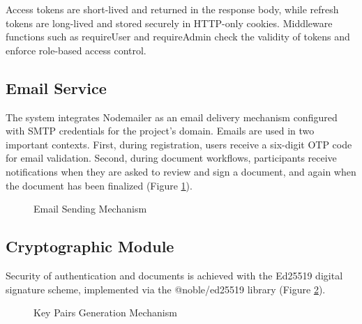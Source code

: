 Access tokens are short-lived and returned in the response body, while refresh tokens are long-lived and stored securely in HTTP-only cookies. Middleware functions such as requireUser and requireAdmin check the validity of tokens and enforce role-based access control.

\subsection{Email Service}
The system integrates Nodemailer as an email delivery mechanism configured with SMTP credentials for the project’s domain. Emails are used in two important contexts. First, during registration, users receive a six-digit OTP code for email validation. Second, during document workflows, participants receive notifications when they are asked to review and sign a document, and again when the document has been finalized (Figure \ref{email-sending}).

\begin{figure}[H]
    \centering
    \caption{Email Sending Mechanism}
    \label{email-sending}
\end{figure}

\subsection{Cryptographic Module}
Security of authentication and documents is achieved with the Ed25519 digital signature scheme, implemented via the @noble/ed25519 library (Figure \ref{keygen}). 

\begin{figure}[H]
    \centering
    \caption{Key Pairs Generation Mechanism}
    \label{keygen}
\end{figure}


